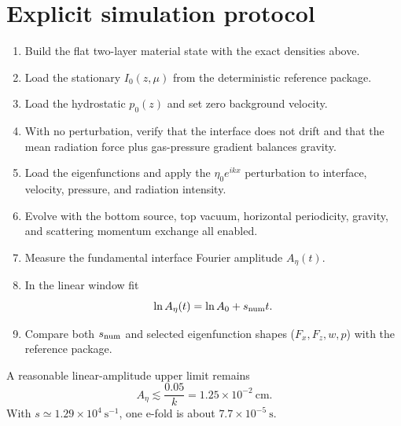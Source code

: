 \documentclass[11pt]{article}
\begin{document}
\section{Explicit simulation protocol}
\begin{enumerate}[leftmargin=2em]
\item Build the flat two-layer material state with the exact densities above.
\item Load the stationary $I_0(z,\mu)$ from the deterministic reference package.
\item Load the hydrostatic $p_0(z)$ and set zero background velocity.
\item With no perturbation, verify that the interface does not drift and that the mean radiation force plus gas-pressure gradient balances gravity.
\item Load the eigenfunctions and apply the $\eta_0e^{ikx}$ perturbation to interface, velocity, pressure, and radiation intensity.
\item Evolve with the bottom source, top vacuum, horizontal periodicity, gravity, and scattering momentum exchange all enabled.
\item Measure the fundamental interface Fourier amplitude $A_\eta(t)$.
\item In the linear window fit
\begin{equation}
\ln A_\eta(t)=\ln A_0+s_{\rm num}t.
\end{equation}
\item Compare both $s_{\rm num}$ and selected eigenfunction shapes ($F_x,F_z,w,p$) with the reference package.
\end{enumerate}

A reasonable linear-amplitude upper limit remains
\begin{equation}
A_\eta\lesssim\frac{0.05}{k}=1.25\times10^{-2}\ \mathrm{cm}.
\end{equation}
With $s\simeq1.29\times10^4\ \mathrm{s^{-1}}$, one e-fold is about $7.7\times10^{-5}\ \mathrm{s}$.
\end{document}
